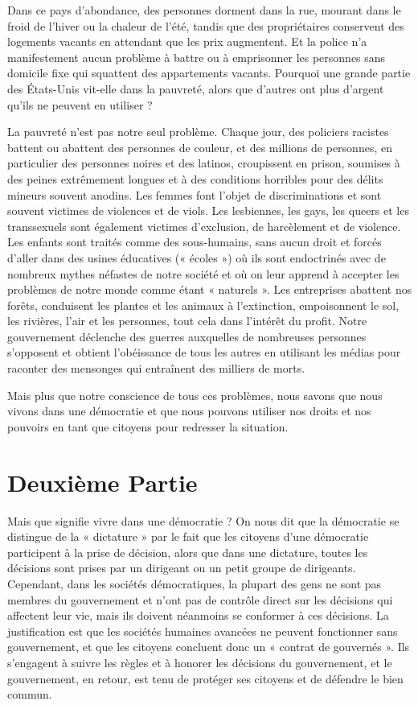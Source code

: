 Dans ce pays d'abondance, des personnes dorment dans la rue, mourant dans le froid de l'hiver ou la chaleur de l'été, tandis que des propriétaires conservent des logements vacants en attendant que les prix augmentent. Et la police n'a manifestement aucun problème à battre ou à emprisonner les personnes sans domicile fixe qui squattent des appartements vacants. Pourquoi une grande partie des États-Unis vit-elle dans la pauvreté, alors que d'autres ont plus d'argent qu'ils ne peuvent en utiliser ?

La pauvreté n'est pas notre seul problème. Chaque jour, des policiers racistes battent ou abattent des personnes de couleur, et des millions de personnes, en particulier des personnes noires et des latinos, croupissent en prison, soumises à des peines extrêmement longues et à des conditions horribles pour des délits mineurs souvent anodins. Les femmes font l'objet de discriminations et sont souvent victimes de violences et de viols. Les lesbiennes, les gays, les queers et les transsexuels sont également victimes d'exclusion, de harcèlement et de violence. Les enfants sont traités comme des sous-humains, sans aucun droit et forcés d'aller dans des usines éducatives (« écoles ») où ils sont endoctrinés avec de nombreux mythes néfastes de notre société et où on leur apprend à accepter les problèmes de notre monde comme étant « naturels ». Les entreprises abattent nos forêts, conduisent les plantes et les animaux à l'extinction, empoisonnent le sol, les rivières, l'air et les personnes, tout cela dans l'intérêt du profit. Notre gouvernement déclenche des guerres auxquelles de nombreuses personnes s'opposent et obtient l'obéissance de tous les autres en utilisant les médias pour raconter des mensonges qui entraînent des milliers de morts.

Mais plus que notre conscience de tous ces problèmes, nous savons que nous vivons dans une démocratie et que nous pouvons utiliser nos droits et nos pouvoirs en tant que citoyens pour redresser la situation.

\chapter*{\textbf{Deuxième Partie}}\hypertarget{deuxime-partie}{}\label{deuxime-partie}

Mais que signifie vivre dans une démocratie ? On nous dit que la démocratie se distingue de la « dictature » par le fait que les citoyens d'une démocratie participent à la prise de décision, alors que dans une dictature, toutes les décisions sont prises par un dirigeant ou un petit groupe de dirigeants. Cependant, dans les sociétés démocratiques, la plupart des gens ne sont pas membres du gouvernement et n'ont pas de contrôle direct sur les décisions qui affectent leur vie, mais ils doivent néanmoins se conformer à ces décisions. La justification est que les sociétés humaines avancées ne peuvent fonctionner sans gouvernement, et que les citoyens concluent donc un « contrat de gouvernés ». Ils s'engagent à suivre les règles et à honorer les décisions du gouvernement, et le gouvernement, en retour, est tenu de protéger ses citoyens et de défendre le bien commun.

